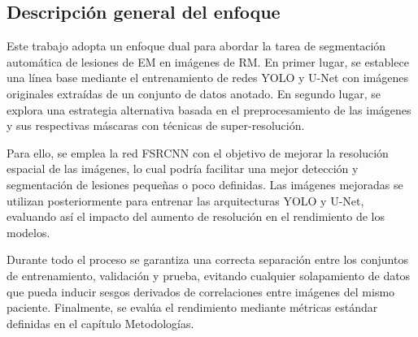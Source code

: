 \documentclass[../main.tex]{subfiles}
\begin{document}
\subsection{Descripción general del enfoque}
Este trabajo adopta un enfoque dual para abordar la tarea de segmentación automática de lesiones de EM en imágenes de RM. En primer lugar, se establece una línea base mediante el entrenamiento de redes YOLO y U-Net con imágenes originales extraídas de un conjunto de datos anotado. En segundo lugar, se explora una estrategia alternativa basada en el preprocesamiento de las imágenes y sus respectivas máscaras con técnicas de super-resolución.

Para ello, se emplea la red FSRCNN con el objetivo de mejorar la resolución espacial de las imágenes, lo cual podría facilitar una mejor detección y segmentación de lesiones pequeñas o poco definidas. Las imágenes mejoradas se utilizan posteriormente para entrenar las arquitecturas YOLO y U-Net, evaluando así el impacto del aumento de resolución en el rendimiento de los modelos.

Durante todo el proceso se garantiza una correcta separación entre los conjuntos de entrenamiento, validación y prueba, evitando cualquier solapamiento de datos que pueda inducir sesgos derivados de correlaciones entre imágenes del mismo paciente. Finalmente, se evalúa el rendimiento mediante métricas estándar definidas en el capítulo Metodologías.
\end{document}
